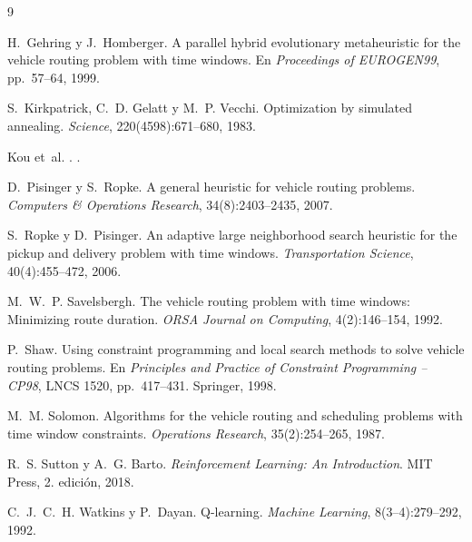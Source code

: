 \begin{thebibliography}{9}

H.~Gehring y J.~Homberger.
\newblock A parallel hybrid evolutionary metaheuristic for the vehicle routing problem with time windows.
\newblock En \emph{Proceedings of EUROGEN99}, pp.~57--64, 1999.

S.~Kirkpatrick, C.~D. Gelatt y M.~P. Vecchi.
\newblock Optimization by simulated annealing.
\newblock \emph{Science}, 220(4598):671--680, 1983.

Kou et~al.
.
.

D.~Pisinger y S.~Ropke.
\newblock A general heuristic for vehicle routing problems.
\newblock \emph{Computers \& Operations Research}, 34(8):2403--2435, 2007.

S.~Ropke y D.~Pisinger.
\newblock An adaptive large neighborhood search heuristic for the pickup and delivery problem with time windows.
\newblock \emph{Transportation Science}, 40(4):455--472, 2006.

M.~W.~P. Savelsbergh.
\newblock The vehicle routing problem with time windows: Minimizing route duration.
\newblock \emph{ORSA Journal on Computing}, 4(2):146--154, 1992.

P.~Shaw.
\newblock Using constraint programming and local search methods to solve vehicle routing problems.
\newblock En \emph{Principles and Practice of Constraint Programming -- CP98}, LNCS 1520, pp.~417--431. Springer, 1998.

M.~M. Solomon.
\newblock Algorithms for the vehicle routing and scheduling problems with time window constraints.
\newblock \emph{Operations Research}, 35(2):254--265, 1987.

R.~S. Sutton y A.~G. Barto.
\newblock \emph{Reinforcement Learning: An Introduction}.
\newblock MIT Press, 2.\textordfeminine{} edición, 2018.

C.~J.~C.~H. Watkins y P.~Dayan.
\newblock Q-learning.
\newblock \emph{Machine Learning}, 8(3--4):279--292, 1992.

\end{thebibliography}
